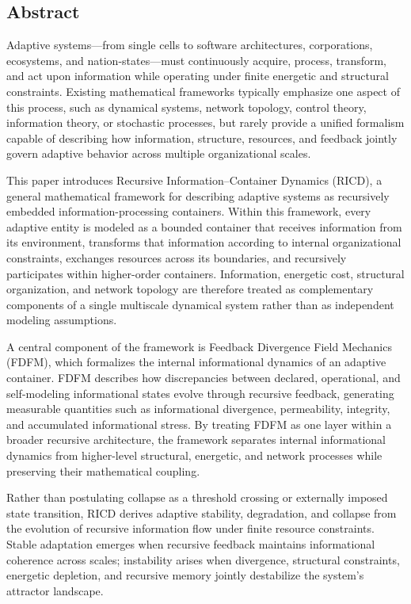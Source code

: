 \documentclass[
]{article}
\begin{document}
\hypertarget{abstract}{%
\subsection{Abstract}\label{abstract}}

Adaptive systems---from single cells to software architectures,
corporations, ecosystems, and nation-states---must continuously acquire,
process, transform, and act upon information while operating under
finite energetic and structural constraints. Existing mathematical
frameworks typically emphasize one aspect of this process, such as
dynamical systems, network topology, control theory, information theory,
or stochastic processes, but rarely provide a unified formalism capable
of describing how information, structure, resources, and feedback
jointly govern adaptive behavior across multiple organizational scales.

This paper introduces Recursive Information--Container Dynamics (RICD),
a general mathematical framework for describing adaptive systems as
recursively embedded information-processing containers. Within this
framework, every adaptive entity is modeled as a bounded container that
receives information from its environment, transforms that information
according to internal organizational constraints, exchanges resources
across its boundaries, and recursively participates within higher-order
containers. Information, energetic cost, structural organization, and
network topology are therefore treated as complementary components of a
single multiscale dynamical system rather than as independent modeling
assumptions.

A central component of the framework is Feedback Divergence Field
Mechanics (FDFM), which formalizes the internal informational dynamics
of an adaptive container. FDFM describes how discrepancies between
declared, operational, and self-modeling informational states evolve
through recursive feedback, generating measurable quantities such as
informational divergence, permeability, integrity, and accumulated
informational stress. By treating FDFM as one layer within a broader
recursive architecture, the framework separates internal informational
dynamics from higher-level structural, energetic, and network processes
while preserving their mathematical coupling.

Rather than postulating collapse as a threshold crossing or externally
imposed state transition, RICD derives adaptive stability, degradation,
and collapse from the evolution of recursive information flow under
finite resource constraints. Stable adaptation emerges when recursive
feedback maintains informational coherence across scales; instability
arises when divergence, structural constraints, energetic depletion, and
recursive memory jointly destabilize the system's attractor landscape.
\end{document}
